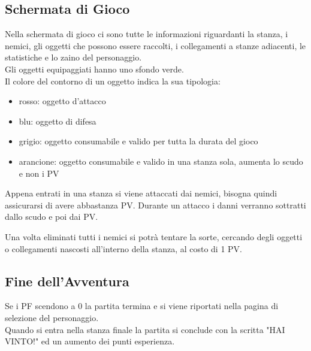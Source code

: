 \documentclass[11pt]{article}
\begin{document}
\subsection{Schermata di Gioco}
Nella schermata di gioco ci sono tutte le informazioni riguardanti la stanza, i nemici, gli oggetti che possono essere raccolti, i collegamenti a stanze adiacenti, le statistiche e lo zaino del personaggio.\\
Gli oggetti equipaggiati hanno uno sfondo verde.\\
Il colore del contorno di un oggetto indica la sua tipologia:
\begin{itemize}
\item rosso: oggetto d'attacco
\item blu: oggetto di difesa
\item grigio: oggetto consumabile e valido per tutta la durata del gioco
\item arancione: oggetto consumabile e valido in una stanza sola, aumenta lo scudo e non i PV
\end{itemize}

Appena entrati in una stanza si viene attaccati dai nemici, bisogna quindi assicurarsi di avere abbastanza PV.
Durante un attacco i danni verranno sottratti dallo scudo e poi dai PV.
\begin{center}
\end{center}
 
Una volta eliminati tutti i nemici si potrà tentare la sorte, cercando degli oggetti o collegamenti nascosti all'interno della stanza, al costo di 1 PV.
\begin{center}
\end{center}

\subsection{Fine dell'Avventura}
Se i PF scendono a 0 la partita termina e si viene riportati nella pagina di selezione del personaggio.\\
Quando si entra nella stanza finale la partita si conclude con la scritta "HAI VINTO!" ed un aumento dei punti esperienza.\\
\end{document}
